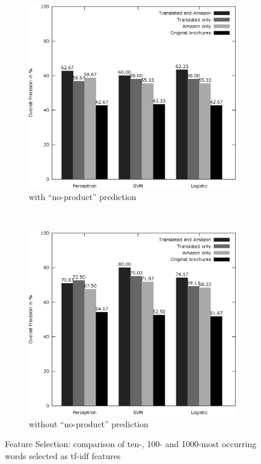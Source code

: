 \begin{figure}[ht]
	\centering
	\begin{subfigure}[t]{0.5\textwidth}
		\includegraphics[width=\textwidth]{figures/product_translate_amazon_with_none.eps}
		\caption{with ``no-product'' prediction}
	\end{subfigure}~
	\begin{subfigure}[t]{0.5\textwidth}
		\includegraphics[width=\textwidth]{figures/product_translate_amazon_without_none.eps}
		\caption{without ``no-product'' prediction}
	\end{subfigure}
	\caption{Feature Selection: comparison of ten-, 100- and 1000-most occurring words selected as tf-idf features}
	\label{fig:product_translate_amazon}
\end{figure}

